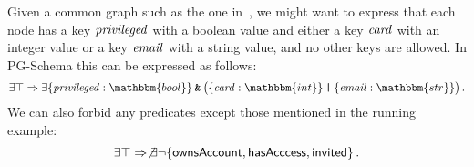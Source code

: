 \begin{example}
\label{ex:closedgraph}
    Given a common graph such as the one in~, we might want to express that each node has a key $\mathit{privileged}$ with a boolean value and  either a key $\mathit{card}$ with an integer value or a key $\mathit{email}$ with a string value, and no other keys are allowed. In PG-Schema this  can be expressed as follows:
    \[ \exists \top \Rightarrow \exists \{\exprivileged: \mathbbm{bool}\} \tAnd\big(\{ \excard : \mathbbm{int} \} \tOr \{ \exemail : \mathbbm{str} \}\big) \,.\]
    We can also forbid  any predicates except those mentioned in the running example:
    \[ \exists \top \Rightarrow \not\exists \lnot \{\mathsf{ownsAccount},\mathsf{hasAcccess},\mathsf{invited}\} \,.\]
\end{example}